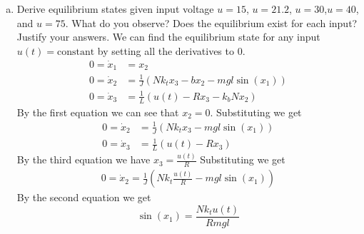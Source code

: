 \documentclass{article}
\begin{document}
\begin{enumerate}[a)]
\item Derive equilibrium states given input voltage $u = 15$, $u=21.2$, $u=30$,$u = 40$, and $u = 75$.
What do you observe?
Does the equilibrium exist for each input?
Justify your answers.
\newline
\newline
We can find the equilibrium state for any input $u(t) = \text{constant}$ by setting all the derivatives to $0$.
\begin{align}
0 = \dot{x}_1 &= x_2 \nonumber \\
0 = \dot{x}_2 &= \frac{1}{J}(Nk_tx_3 - bx_2 - mgl\sin(x_1) ) \nonumber \\
0 = \dot{x}_3 &= \frac{1}{L}(u(t) - Rx_3 - k_bNx_2) \nonumber
\end{align}
By the first equation we can see that $x_2 = 0$. Substituting we get
\begin{align}
0 = \dot{x}_2 &= \frac{1}{J}(Nk_tx_3 - mgl\sin(x_1) ) \nonumber \\
0 = \dot{x}_3 &= \frac{1}{L}(u(t) - Rx_3) \nonumber
\end{align}
By the third equation we have $x_3 = \frac{u(t)}{R}$ Substituting we get
\begin{align}
0 = \dot{x}_2 = \frac{1}{J}(Nk_t\frac{u(t)}{R}- mgl\sin(x_1) ) \nonumber
\end{align}
By the second equation we get
$$
\sin(x_1) = \frac{Nk_tu(t)}{Rmgl}
$$


\end{enumerate}
\end{document}
